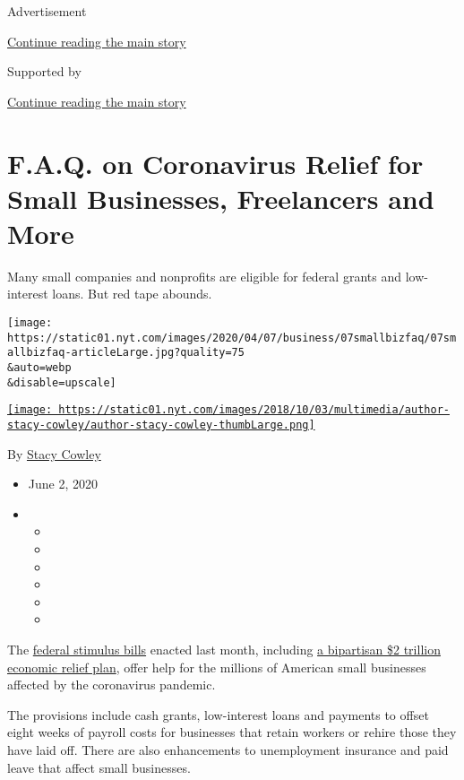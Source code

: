 Advertisement

\protect\hyperlink{after-top}{Continue reading the main story}

Supported by

\protect\hyperlink{after-sponsor}{Continue reading the main story}

\hypertarget{faq-on-coronavirus-relief-for-small-businesses-freelancers-and-more}{%
\section{F.A.Q. on Coronavirus Relief for Small Businesses, Freelancers
and
More}\label{faq-on-coronavirus-relief-for-small-businesses-freelancers-and-more}}

Many small companies and nonprofits are eligible for federal grants and
low-interest loans. But red tape abounds.

\texttt{[image: https://static01.nyt.com/images/2020/04/07/business/07smallbizfaq/07smallbizfaq-articleLarge.jpg?quality=75\\\&auto=webp\\\&disable=upscale]}

\href{https://www.nytimes.com/by/stacy-cowley}{\texttt{[image: https://static01.nyt.com/images/2018/10/03/multimedia/author-stacy-cowley/author-stacy-cowley-thumbLarge.png]}}

By \href{https://www.nytimes.com/by/stacy-cowley}{Stacy Cowley}

\begin{itemize}
\item
  June 2, 2020
\item
  \begin{itemize}
  \item
  \item
  \item
  \item
  \item
  \item
  \end{itemize}
\end{itemize}

The
\href{https://www.nytimes.com/2020/06/02/business/economy/major-employers-coronavirus-relief.html}{federal
stimulus bills} enacted last month, including
\href{https://www.nytimes.com/2020/03/26/us/coronavirus-senate-stimulus-package.html}{a
bipartisan \$2 trillion economic relief plan}, offer help for the
millions of American small businesses affected by the coronavirus
pandemic.

The provisions include cash grants, low-interest loans and payments to
offset eight weeks of payroll costs for businesses that retain workers
or rehire those they have laid off. There are also enhancements to
unemployment insurance and paid leave that affect small businesses.

